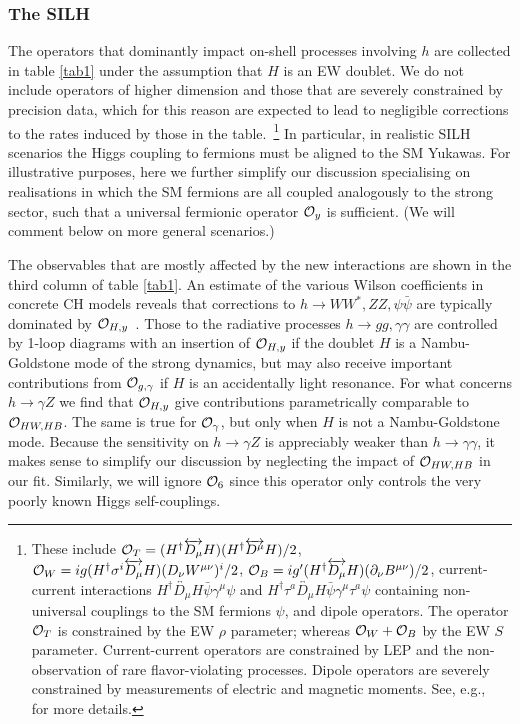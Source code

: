 




\subsubsection*{The SILH}

The operators that dominantly impact on-shell processes involving $h$ are collected in table \ref{tab1} under the assumption that $H$ is an EW doublet. We do not include operators of higher dimension and those that are severely constrained by precision data, which for this reason are expected to lead to negligible corrections to the rates induced by those in the table.~\footnote{These include ${\cal O}_T=(H^\dagger\overleftrightarrow{D_\mu}H)(H^\dagger\overleftrightarrow{D^\mu}H)/2$, ${\cal O}_W={i}g(H^\dagger\sigma^i\overleftrightarrow{D_\mu} H)(D_\nu W^{\mu\nu})^i/2$, ${\cal O}_B=ig'(H^\dagger\overleftrightarrow{D_\mu} H)(\partial_\nu B^{\mu\nu})/2$, current-current interactions $H^\dagger \overleftrightarrow{D_\mu}H \bar \psi\gamma^\mu \psi$ and $H^\dagger \tau^a\overleftrightarrow{D_\mu}H \bar \psi\gamma^\mu \tau^a\psi$ containing non-universal couplings to the SM fermions $\psi$, and dipole operators. The operator ${\cal O}_T$ is constrained by the EW $\rho$ parameter; whereas ${\cal O}_W+{\cal O}_B$ by the EW $S$ parameter. Current-current operators are constrained by LEP and the non-observation of rare flavor-violating processes. Dipole operators are severely constrained by measurements of electric and magnetic moments. See, e.g.,~\cite{Contino:2013kra} for more details.%
} In particular, in realistic SILH scenarios the Higgs coupling to fermions must be aligned to the SM Yukawas. For illustrative purposes, here we further simplify our discussion specialising on realisations in which the SM fermions are all coupled analogously to the strong sector, such that a universal fermionic operator ${\cal O}_y$ is sufficient. (We will comment below on more general scenarios.)

The observables that are mostly affected by the new interactions are shown in the third column of table \ref{tab1}. An estimate of the various Wilson coefficients in concrete CH models reveals that corrections to $h\to WW^*,ZZ,\psi\bar\psi$ are typically dominated by ${\cal O}_{H,y}$~\cite{Giudice:2007fh}. Those to the radiative processes $h\to gg,\gamma\gamma$ are controlled by 1-loop diagrams with an insertion of ${\cal O}_{H,y}$ if the doublet $H$ is a Nambu-Goldstone mode of the strong dynamics, but may also receive important contributions from ${\cal O}_{g,\gamma}$ if $H$ is an accidentally light resonance. For what concerns $h\to\gamma Z$ we find that ${\cal O}_{H,y}$ give contributions parametrically comparable to ${\cal O}_{HW, HB}$. The same is true for ${\cal O}_{\gamma}$, but only when $H$ is not a Nambu-Goldstone mode. Because the sensitivity on $h\to\gamma Z$ is appreciably weaker than $h\to\gamma\gamma$, it makes sense to simplify our discussion by neglecting the impact of ${\cal O}_{HW, HB}$ in our fit. Similarly, we will ignore ${\cal O}_6$ since this operator only controls the very poorly known Higgs self-couplings.

